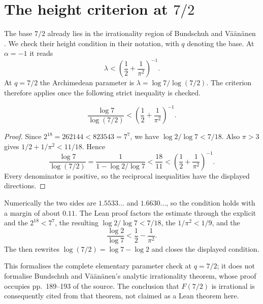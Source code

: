 \section{The height criterion at \texorpdfstring{$7/2$}{7/2}}\label{long1049:sec:sevenhalves}

The base $7/2$ already lies in the irrationality region of
Bundschuh and V\"a\"an\"anen
\cite[Theorem~2, p.~177; hypotheses pp.~175--176]{bv1994}.
We check their height condition in their notation, with $q$
denoting the base. At $\alpha=-1$ it reads
\[
 \lambda<\left(\frac12+\frac1{\pi^2}\right)^{-1}.
\]
At $q=7/2$ the Archimedean parameter is
$\lambda=\log 7/\log(7/2)$.  The criterion therefore applies once the following
strict inequality is checked.

\begin{theorem}\label{long1049:res:sevenhalves}
\[
 \frac{\log 7}{\log(7/2)}
 <
 \left(\frac12+\frac1{\pi^2}\right)^{-1}.
\]
\end{theorem}
\begin{proof}
Since $2^{18}=262144<823543=7^7$, we have
$\log2/\log7<7/18$. Also $\pi>3$ gives
$1/2+1/\pi^2<11/18$. Hence
\[
 \frac{\log7}{\log(7/2)}
 =\frac1{1-\log2/\log7}<\frac{18}{11}
 <\left(\frac12+\frac1{\pi^2}\right)^{-1}.
\]
Every denominator is positive, so the reciprocal inequalities have
the displayed directions.
\end{proof}

\noindent Numerically the two sides are $1.5533\ldots$ and $1.6630\ldots$, so
the condition holds with a margin of about $0.11$.  The Lean proof factors the
estimate through the explicit
 and the
 $2^{18}<7^7$, the resulting
 $\log2/\log7<7/18$, the
$1/\pi^2<1/9$, and the
\[
 \frac{\log2}{\log7}<\frac12-\frac1{\pi^2}.
\]
The
 then rewrites
$\log(7/2)=\log7-\log2$ and closes the displayed condition.

This formalises the complete elementary parameter check at $q=7/2$; it does
not formalise Bundschuh and V\"a\"an\"anen's analytic irrationality theorem,
whose proof occupies pp.~189--193 of the source.  The conclusion that
$F(7/2)$ is irrational is consequently cited from that theorem, not claimed as
a Lean theorem here.

